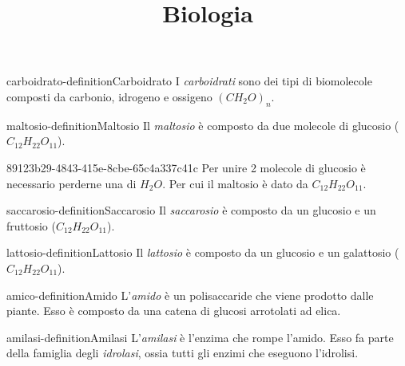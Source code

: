\documentclass[preview]{standalone}
\begin{document}
\title{Biologia}
\genpage

\begin{snippetdefinition}{carboidrato-definition}{Carboidrato}
    I \textit{carboidrati} sono dei tipi di biomolecole composti da carbonio, idrogeno e ossigeno
    \((CH_2O)_n\).
\end{snippetdefinition}


\begin{snippetdefinition}{maltosio-definition}{Maltosio}
    Il \textit{maltosio} è composto da due molecole di glucosio (\(C_{12}H_{22}O_{11}\)).
\end{snippetdefinition}

\begin{snippet}{89123b29-4843-415e-8cbe-65c4a337c41c}
    Per unire 2 molecole di glucosio
è necessario perderne una di \(H_2O\). Per cui il maltosio è dato da \(C_{12}H_{22}O_{11}\).
\end{snippet}

\begin{snippetdefinition}{saccarosio-definition}{Saccarosio}
    Il \textit{saccarosio} è composto da un glucosio e un fruttosio (\(C_{12}H_{22}O_{11}\)).
\end{snippetdefinition}

\begin{snippetdefinition}{lattosio-definition}{Lattosio}
    Il \textit{lattosio} è composto da un glucosio e un galattosio (\(C_{12}H_{22}O_{11}\)).
\end{snippetdefinition}


\begin{snippetdefinition}{amico-definition}{Amido}
    L'\textit{amido} è un polisaccaride che viene prodotto dalle piante.
    Esso è composto da una catena di glucosi arrotolati ad elica.
\end{snippetdefinition}

\begin{snippetdefinition}{amilasi-definition}{Amilasi}
    L'\textit{amilasi} è l'enzima che rompe l'amido.
    Esso fa parte della famiglia degli \textit{idrolasi}, ossia tutti gli enzimi che
    eseguono l'idrolisi.
\end{snippetdefinition}
\end{document}
